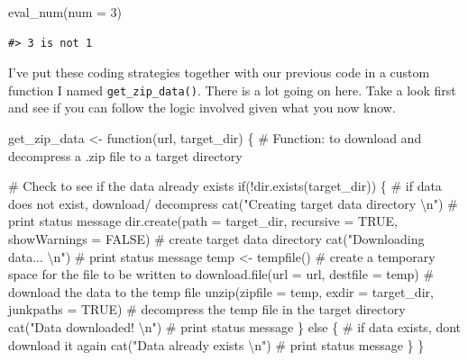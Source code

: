 \documentclass[
  letterpaper,
]{latex/krantz}
\newenvironment{Shaded}{\begin{snugshade}}{\end{snugshade}}
\newcommand{\AttributeTok}[1]{\textcolor[rgb]{0.40,0.45,0.13}{#1}}
\newcommand{\CommentTok}[1]{\textcolor[rgb]{0.37,0.37,0.37}{#1}}
\newcommand{\ConstantTok}[1]{\textcolor[rgb]{0.56,0.35,0.01}{#1}}
\newcommand{\ControlFlowTok}[1]{\textcolor[rgb]{0.00,0.23,0.31}{#1}}
\newcommand{\DecValTok}[1]{\textcolor[rgb]{0.68,0.00,0.00}{#1}}
\newcommand{\FunctionTok}[1]{\textcolor[rgb]{0.28,0.35,0.67}{#1}}
\newcommand{\NormalTok}[1]{\textcolor[rgb]{0.00,0.23,0.31}{#1}}
\newcommand{\OtherTok}[1]{\textcolor[rgb]{0.00,0.23,0.31}{#1}}
\newcommand{\SpecialCharTok}[1]{\textcolor[rgb]{0.37,0.37,0.37}{#1}}
\newcommand{\StringTok}[1]{\textcolor[rgb]{0.13,0.47,0.30}{#1}}
\begin{document}
\begin{Shaded}
\begin{Highlighting}[]
\FunctionTok{eval\_num}\NormalTok{(}\AttributeTok{num =} \DecValTok{3}\NormalTok{)}
\end{Highlighting}
\end{Shaded}

\begin{verbatim}
#> 3 is not 1
\end{verbatim}

I've put these coding strategies together with our previous code in a
custom function I named \texttt{get\_zip\_data()}. There is a lot going
on here. Take a look first and see if you can follow the logic involved
given what you now know.

\begin{Shaded}
\begin{Highlighting}[]
\NormalTok{get\_zip\_data }\OtherTok{\textless{}{-}} \ControlFlowTok{function}\NormalTok{(url, target\_dir) \{}
  \CommentTok{\# Function: to download and decompress a .zip file to a target directory}
  
  \CommentTok{\# Check to see if the data already exists}
  \ControlFlowTok{if}\NormalTok{(}\SpecialCharTok{!}\FunctionTok{dir.exists}\NormalTok{(target\_dir)) \{ }\CommentTok{\# if data does not exist, download/ decompress}
    \FunctionTok{cat}\NormalTok{(}\StringTok{"Creating target data directory }\SpecialCharTok{\textbackslash{}n}\StringTok{"}\NormalTok{) }\CommentTok{\# print status message}
    \FunctionTok{dir.create}\NormalTok{(}\AttributeTok{path =}\NormalTok{ target\_dir, }\AttributeTok{recursive =} \ConstantTok{TRUE}\NormalTok{, }\AttributeTok{showWarnings =} \ConstantTok{FALSE}\NormalTok{) }\CommentTok{\# create target data directory}
    \FunctionTok{cat}\NormalTok{(}\StringTok{"Downloading data... }\SpecialCharTok{\textbackslash{}n}\StringTok{"}\NormalTok{) }\CommentTok{\# print status message}
\NormalTok{    temp }\OtherTok{\textless{}{-}} \FunctionTok{tempfile}\NormalTok{() }\CommentTok{\# create a temporary space for the file to be written to}
    \FunctionTok{download.file}\NormalTok{(}\AttributeTok{url =}\NormalTok{ url, }\AttributeTok{destfile =}\NormalTok{ temp) }\CommentTok{\# download the data to the temp file}
    \FunctionTok{unzip}\NormalTok{(}\AttributeTok{zipfile =}\NormalTok{ temp, }\AttributeTok{exdir =}\NormalTok{ target\_dir, }\AttributeTok{junkpaths =} \ConstantTok{TRUE}\NormalTok{) }\CommentTok{\# decompress the temp file in the target directory}
    \FunctionTok{cat}\NormalTok{(}\StringTok{"Data downloaded! }\SpecialCharTok{\textbackslash{}n}\StringTok{"}\NormalTok{) }\CommentTok{\# print status message}
\NormalTok{  \} }\ControlFlowTok{else}\NormalTok{ \{ }\CommentTok{\# if data exists, don\textquotesingle{}t download it again}
    \FunctionTok{cat}\NormalTok{(}\StringTok{"Data already exists }\SpecialCharTok{\textbackslash{}n}\StringTok{"}\NormalTok{) }\CommentTok{\# print status message}
\NormalTok{  \}}
\NormalTok{\}}
\end{Highlighting}
\end{Shaded}
\end{document}
